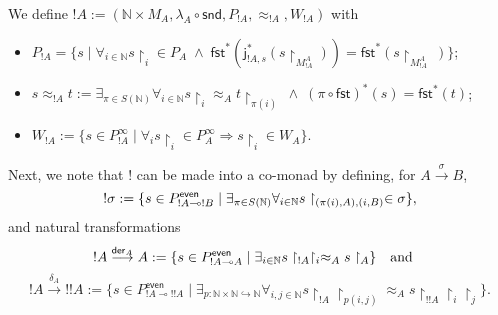 \documentclass[runningheads,a4paper]{llncs}
\newcommand{\ra}[1]{\stackrel{#1}{\longrightarrow}}
\newcommand{\txt}[1]{\quad\textnormal{#1}\quad}
\begin{document}
\begin{definition}[Bang] We define $!A:=(\mathbb{N}\times M_A,\lambda_A\circ\mathsf{snd}, P_{!A},\approx_{!A},W_{!A})$ with\vspace{-3pt}
\begin{itemize}
\item $P_{!A}=\{s\;|\; \forall_{i\in\mathbb{N}}s\upharpoonright_i\in P_A\;\wedge\;  \mathsf{fst}^*(\mathsf{j}_{!A,s}^*(s\upharpoonright_{M_{!A
 }^A}))=\mathsf{fst}^*(s\upharpoonright_{M_{!A}^A}~)\}$; \item $s\approx_{!A} t:=\exists_{\pi\in S(\mathbb{N})}\forall_{i\in \mathbb{N}}s\upharpoonright_i\approx_A t\upharpoonright_{\pi(i)}\; \wedge \; (\pi\circ \mathsf{fst})^*(s)=\mathsf{fst}^*(t)$;
\item $W_{!A}:= \{s\in P_{!A}^\infty\;|\; \forall_i s\upharpoonright_i\in P_A^\infty \Rightarrow s\upharpoonright_i\in W_A\}$.
\end{itemize}
\end{definition}
Next, we note that $!$ can be made into a co-monad by defining, for $A\ra{\sigma}B$, \vspace{-3pt}
$$!\sigma:=\{s\in P_{!A\multimap !B}^\mathsf{even}\;|\; \exists_{\pi\in S(\mathbb{N})} \forall_{i\in \mathbb{N}} s\upharpoonright_{(\pi(i),A), (i,B)}\in \sigma\},\vspace{-3pt}$$
and natural transformations $$!A\ra{\mathsf{der}_A}A:=\{s\in P_{!A\multimap A}^\mathsf{even}\;|\; \exists_{i\in\mathbb{N}} s\upharpoonright_{!A}\upharpoonright_i\approx_A s\upharpoonright_A\}\txt{and}\vspace{-3pt}$$\vspace{-8pt} $$!A\ra{\delta_A}!!A:=\{s\in P_{!A\multimap !!A}^\mathsf{even}\;|\; \exists_{p:\mathbb{N}\times\mathbb{N}\hookrightarrow\mathbb{N}} \forall_{i,j\in \mathbb{N}} s\upharpoonright_{!A}\upharpoonright_{p(i,j)}\approx_A s\upharpoonright_{!!A}\upharpoonright_i\upharpoonright_j \}.$$
\end{document}
